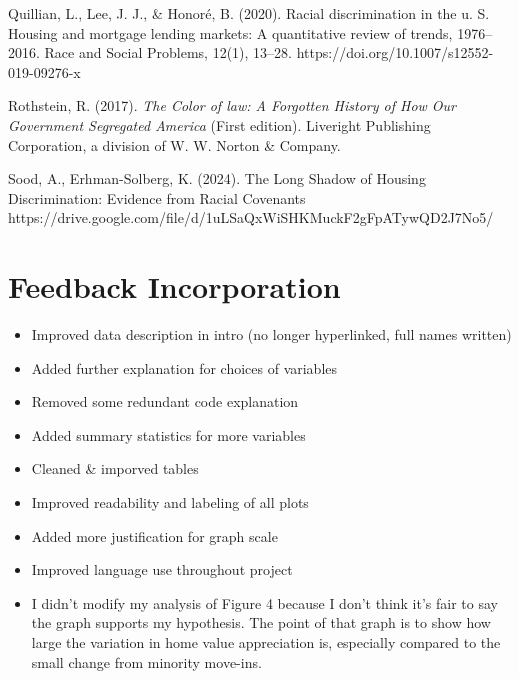 \documentclass[11pt]{article}
\providecommand{\tightlist}{%
      \setlength{\itemsep}{0pt}\setlength{\parskip}{0pt}}
\begin{document}
    Quillian, L., Lee, J. J., \& Honoré, B. (2020). Racial discrimination in the u. S. Housing and mortgage lending markets: A quantitative review of trends, 1976–2016. Race and Social Problems, 12(1), 13–28. https://doi.org/10.1007/s12552-019-09276-x
    
    Rothstein, R. (2017). \textit{The Color of law: A Forgotten History of How Our Government Segregated America} (First edition). Liveright Publishing Corporation, a division of W. W. Norton \& Company.
    
    Sood, A., Erhman-Solberg, K. (2024). The Long Shadow of Housing Discrimination: Evidence from Racial Covenants https://drive.google.com/file/d/1uLSaQxWiSHKMuckF2gFpATywQD2J7No5/    
\newpage
\appendix
\section{Feedback Incorporation}\label{feedback-incorporation}

\begin{itemize}
    \tightlist
    \item
    Improved data description in intro (no longer hyperlinked, full names
    written)
    \item
    Added further explanation for choices of variables
    \item
    Removed some redundant code explanation
    \item
    Added summary statistics for more variables
    \item
    Cleaned \& imporved tables
    \item
    Improved readability and labeling of all plots
    \item
    Added more justification for graph scale
    \item
    Improved language use throughout project
    \item
    I didn't modify my analysis of Figure 4 because I don't think it's
    fair to say the graph supports my hypothesis. The point of that graph
    is to show how large the variation in home value appreciation is,
    especially compared to the small change from minority move-ins.
\end{itemize}    
    
\end{document}
